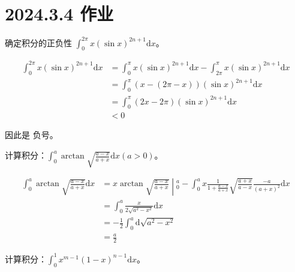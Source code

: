 \ifx\allfiles\undefined

\date{}
\author{尹锦润}

\maketitle
\fi

\section{2024.3.4 作业}

\begin{ques}
	确定积分的正负性 $\displaystyle \int _{0}^{2\pi } x(\sin x)^{2n+1}\mathrm{d} x$。
\end{ques}
\begin{equation*}
	\begin{aligned}
		\int _{0}^{2\pi } x(\sin x)^{2n+1}\mathrm{d} x & =\int _{0}^{\pi } x(\sin x)^{2n+1}\mathrm{d} x-\int _{2\pi }^{\pi } x(\sin x)^{2n+1}\mathrm{d} x\\
		& =\int _{0}^{\pi }( x-( 2\pi -x))(\sin x)^{2n+1}\mathrm{d} x\\
		& =\int _{0}^{\pi }( 2x-2\pi )(\sin x)^{2n+1}\mathrm{d} x\\
		& < 0
	\end{aligned}
\end{equation*}


因此是 负号。



\begin{ques}
	计算积分：$\displaystyle \int _{0}^{a}\arctan\sqrt{\frac{a-x}{a+x}}\mathrm{d} x( a >0)$。
\end{ques}
\begin{equation*}
	\begin{aligned}
		\int _{0}^{a}\arctan\sqrt{\frac{a-x}{a+x}}\mathrm{d} x & =\left. x\arctan\sqrt{\frac{a-x}{a+x}}\middle| _{0}^{a}\right. -\int _{0}^{a} x\frac{1}{1+\frac{a-x}{a+x}}\sqrt{\frac{a+x}{a-x}}\frac{-a}{( a+x)^{2}}\mathrm{d} x\\
		& =\int _{0}^{a}\frac{x}{2\sqrt{a^{2} -x^{2}}}\mathrm{d} x\\
		& =-\frac{1}{2}\int _{0}^{a}\mathrm{d}\sqrt{a^{2} -x^{2}}\\
		& =\frac{a}{2}
	\end{aligned}
\end{equation*}




\begin{ques}
	计算积分：$\displaystyle \int _{0}^{1} x^{m-1}( 1-x)^{n-1}\mathrm{d} x$。
\end{ques}



